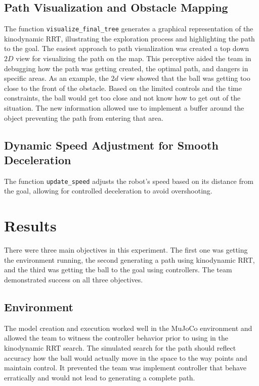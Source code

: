 \documentclass[12pt]{article}
\begin{document}
\subsection{Path Visualization and Obstacle Mapping}
The function \texttt{visualize\_final\_tree} generates a graphical representation of the kinodynamic RRT, illustrating the exploration process and highlighting the path to the goal. The easiest approach to path visualization was created a top down $2D$ view for visualizing the path on the map. This perceptive aided the team in debugging how the path was getting created, the optimal path, and dangers in specific areas. As an example, the $2d$ view showed that the ball was getting too close to the front of the obstacle. Based on the limited controls and the time constraints, the ball would get too close and not know how to get out of the situation. The new information allowed use to implement a buffer around the object preventing the path from entering that area. 

\subsection{Dynamic Speed Adjustment for Smooth Deceleration}
The function \texttt{update\_speed} adjusts the robot's speed based on its distance from the goal, allowing for controlled deceleration to avoid overshooting.

\section{Results}

There were three main objectives in this experiment. The first one was getting the environment running, the second generating a path using kinodynamic RRT, and the third was getting the ball to the goal using controllers. The team demonstrated success on all three objectives. 

\subsection{Environment}

The model creation and execution worked well in the MuJoCo environment and allowed the team to witness the controller behavior prior to using in the kinodynamic RRT search. The simulated search for the path should reflect accuracy how the ball would actually move in the space to the way points and maintain control. It prevented the team was implement controller that behave erratically and would not lead to generating a complete path.
\end{document}
